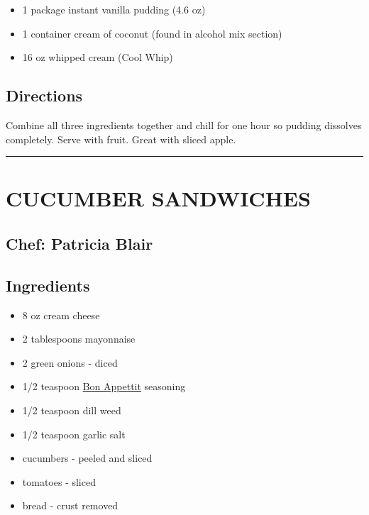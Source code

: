 \documentclass[
]{book}
\providecommand{\tightlist}{%
  \setlength{\itemsep}{0pt}\setlength{\parskip}{0pt}}
\begin{document}
\begin{itemize}
\tightlist
\item
  1 package instant vanilla pudding (4.6 oz)
\item
  1 container cream of coconut (found in alcohol mix section)
\item
  16 oz whipped cream (Cool Whip)
\end{itemize}

\hypertarget{directions-2}{%
\subsection*{Directions}\label{directions-2}}


Combine all three ingredients together and chill for one hour so pudding dissolves completely.
Serve with fruit. Great with sliced apple.

\begin{center}\rule{0.5\linewidth}{0.5pt}\end{center}

\hypertarget{cucumber-sandwiches}{%
\section*{CUCUMBER SANDWICHES}\label{cucumber-sandwiches}}


\hypertarget{chef-patricia-blair-1}{%
\subsection*{Chef: Patricia Blair}\label{chef-patricia-blair-1}}


\hypertarget{ingredients-3}{%
\subsection*{Ingredients}\label{ingredients-3}}


\begin{itemize}
\tightlist
\item
  8 oz cream cheese
\item
  2 tablespoons mayonnaise
\item
  2 green onions - diced
\item
  1/2 teaspoon \href{https://www.mccormick.com/gourmet/recipes/other/bon-appetit-seasoning-replacement}{Bon Appettit} seasoning
\item
  1/2 teaspoon dill weed
\item
  1/2 teaspoon garlic salt
\item
  cucumbers - peeled and sliced
\item
  tomatoes - sliced
\item
  bread - crust removed
\end{itemize}
\end{document}
